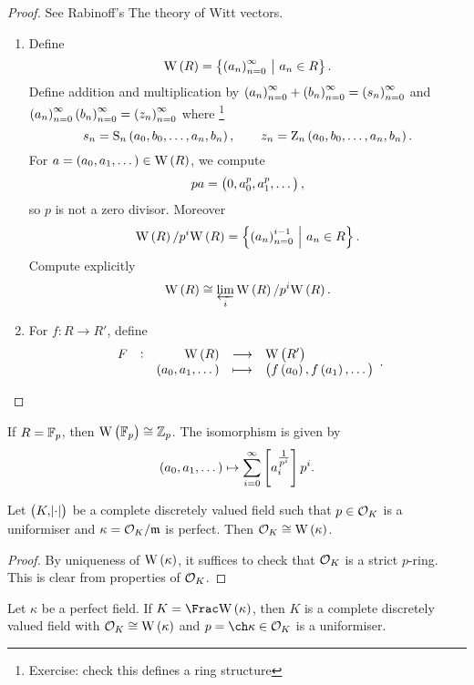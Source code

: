 \pagebreak

\begin{proof}
See Rabinoff's The theory of Witt vectors.
\begin{enumerate}
\item Define
$$ \W\br{R} = \cbr{\br{a_n}_{n = 0}^\infty \st a_n \in R}. $$
Define addition and multiplication by $ \br{a_n}_{n = 0}^\infty + \br{b_n}_{n = 0}^\infty = \br{s_n}_{n = 0}^\infty $ and $ \br{a_n}_{n = 0}^\infty\br{b_n}_{n = 0}^\infty = \br{z_n}_{n = 0}^\infty $ where \footnote{Exercise: check this defines a ring structure}
$$ s_n = \S_n\br{a_0, b_0, \dots, a_n, b_n}, \qquad z_n = \Z_n\br{a_0, b_0, \dots, a_n, b_n}. $$
For $ a = \br{a_0, a_1, \dots} \in \W\br{R} $, we compute
$$ pa = \br{0, a_0^p, a_1^p, \dots}, $$
so $ p $ is not a zero divisor. Moreover
$$ \W\br{R} / p^i\W\br{R} = \cbr{\br{a_n}_{n = 0}^{i - 1} \st a_n \in R}. $$
Compute explicitly
$$ \W\br{R} \cong \varprojlim_i \W\br{R} / p^i\W\br{R}. $$
\item For $ f : R \to R' $, define
$$ \function[F]{\W\br{R}}{\W\br{R'}}{\br{a_0, a_1, \dots}}{\br{f\br{a_0}, f\br{a_1}, \dots}}. $$
\end{enumerate}
\end{proof}

\begin{remark*}
If $ R = \mathbb{F}_p $, then $ \W\br{\FF_p} \cong \ZZ_p $. The isomorphism is given by
$$ \br{a_0, a_1, \dots} \mapsto \sum_{i = 0}^\infty \sbr{a_i^{\tfrac{1}{p^i}}}p^i. $$
\end{remark*}

\begin{proposition}
Let $ \br{K, \abs{\cdot}} $ be a complete discretely valued field such that $ p \in \mathcal{O}_K $ is a uniformiser and $ \kappa = \mathcal{O}_K / \mathfrak{m} $ is perfect. Then $ \OOO_K \cong \W\br{\kappa} $.
\end{proposition}

\begin{proof}
By uniqueness of $ \W\br{\kappa} $, it suffices to check that $ \mathcal{O}_K $ is a strict $ p $-ring. This is clear from properties of $ \mathcal{O}_K $.
\end{proof}


\begin{remark*}
Let $ \kappa $ be a perfect field. If $ K = \Frac \W\br{\kappa} $, then $ K $ is a complete discretely valued field with $ \OOO_K \cong \W\br{\kappa} $ and $ p = \ch \kappa \in \OOO_K $ is a uniformiser.
\end{remark*}

